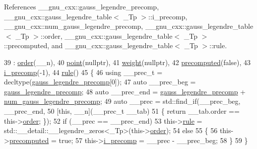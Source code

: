 References \+\_\+\+\_\+gnu\+\_\+cxx\+::gauss\+\_\+legendre\+\_\+precomp, \+\_\+\+\_\+gnu\+\_\+cxx\+::gauss\+\_\+legendre\+\_\+table$<$ \+\_\+\+Tp $>$\+::i\+\_\+precomp, \+\_\+\+\_\+gnu\+\_\+cxx\+::num\+\_\+gauss\+\_\+legendre\+\_\+precomp, \+\_\+\+\_\+gnu\+\_\+cxx\+::gauss\+\_\+legendre\+\_\+table$<$ \+\_\+\+Tp $>$\+::order, \+\_\+\+\_\+gnu\+\_\+cxx\+::gauss\+\_\+legendre\+\_\+table$<$ \+\_\+\+Tp $>$\+::precomputed, and \+\_\+\+\_\+gnu\+\_\+cxx\+::gauss\+\_\+legendre\+\_\+table$<$ \+\_\+\+Tp $>$\+::rule.


\begin{DoxyCode}
39       : \hyperlink{struct____gnu__cxx_1_1gauss__legendre__table_aecdc9cdb90f5a7b4f06a455cd868370f}{order}(\_\_n),
40         \hyperlink{struct____gnu__cxx_1_1gauss__legendre__table_a2b2ec503ecb0fa74ccdba5b81e4edcd0}{point}(\textcolor{keyword}{nullptr}),
41         \hyperlink{struct____gnu__cxx_1_1gauss__legendre__table_a4bc3bb73288637899d2eb459eb751607}{weight}(\textcolor{keyword}{nullptr}),
42         \hyperlink{struct____gnu__cxx_1_1gauss__legendre__table_acbcd2eeb79842a232207882c5a4d01c0}{precomputed}(\textcolor{keyword}{false}),
43         \hyperlink{struct____gnu__cxx_1_1gauss__legendre__table_a6f86bbb7d5ed663b88683156a38f4a05}{i\_precomp}(-1),
44         \hyperlink{struct____gnu__cxx_1_1gauss__legendre__table_a1c1f6c907f2bcee143c39136679901b4}{rule}()
45       \{
46         \textcolor{keyword}{using} \_\_prec\_t = decltype(\hyperlink{namespace____gnu__cxx_a2e3dcc11970f62e2c7e9d81502b2f84b}{gauss\_legendre\_precomp}[0]);
47         \textcolor{keyword}{auto} \_\_prec\_beg = \hyperlink{namespace____gnu__cxx_a2e3dcc11970f62e2c7e9d81502b2f84b}{gauss\_legendre\_precomp};
48         \textcolor{keyword}{auto} \_\_prec\_end = \hyperlink{namespace____gnu__cxx_a2e3dcc11970f62e2c7e9d81502b2f84b}{gauss\_legendre\_precomp} + 
      \hyperlink{namespace____gnu__cxx_a6b3fdb3b976805e974e633eae91469ed}{num\_gauss\_legendre\_precomp};
49         \textcolor{keyword}{auto} \_\_prec = std::find\_if(\_\_prec\_beg, \_\_prec\_end,
50                                    [\textcolor{keyword}{this}, \_\_n](\_\_prec\_t \_\_tab)
51                                    \{ \textcolor{keywordflow}{return} \_\_tab.order == this->\hyperlink{struct____gnu__cxx_1_1gauss__legendre__table_aecdc9cdb90f5a7b4f06a455cd868370f}{order}; \});
52         \textcolor{keywordflow}{if} (\_\_prec == \_\_prec\_end)
53           this->\hyperlink{struct____gnu__cxx_1_1gauss__legendre__table_a1c1f6c907f2bcee143c39136679901b4}{rule} = std::\_\_detail::\_\_legendre\_zeros<\_Tp>(this->\hyperlink{struct____gnu__cxx_1_1gauss__legendre__table_aecdc9cdb90f5a7b4f06a455cd868370f}{order});
54         \textcolor{keywordflow}{else}
55           \{
56             this->\hyperlink{struct____gnu__cxx_1_1gauss__legendre__table_acbcd2eeb79842a232207882c5a4d01c0}{precomputed} = \textcolor{keyword}{true};
57             this->\hyperlink{struct____gnu__cxx_1_1gauss__legendre__table_a6f86bbb7d5ed663b88683156a38f4a05}{i\_precomp} = \_\_prec - \_\_prec\_beg;
58           \}
59       \}
\end{DoxyCode}


